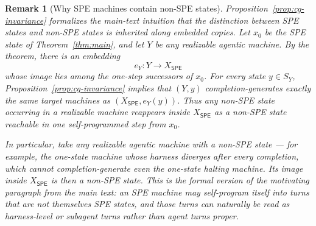 \documentclass[11pt]{article}
\newtheorem{remark}[definition]{Remark}
\newcommand{\SPE}{\mathsf{SPE}}
\begin{document}
\begin{remark}[Why SPE machines contain non-SPE states]\label{rem:nonspe}
Proposition~\ref{prop:cg-invariance} formalizes the main-text intuition that the distinction between SPE states and non-SPE states is inherited along embedded copies. Let $x_0$ be the SPE state of Theorem~\ref{thm:main}, and let $Y$ be any realizable agentic machine. By the theorem, there is an embedding
\[
e_Y:Y\to X_{\SPE}
\]
whose image lies among the one-step successors of $x_0$. For every state $y\in S_Y$, Proposition~\ref{prop:cg-invariance} implies that $(Y,y)$ completion-generates exactly the same target machines as $(X_{\SPE},e_Y(y))$. Thus any non-SPE state occurring in a realizable machine reappears inside $X_{\SPE}$ as a non-SPE state reachable in one self-programmed step from $x_0$.

In particular, take any realizable agentic machine with a non-SPE state --- for example, the one-state machine whose harness diverges after every completion, which cannot completion-generate even the one-state halting machine. Its image inside $X_{\SPE}$ is then a non-SPE state. This is the formal version of the motivating paragraph from the main text: an SPE machine may self-program itself into turns that are not themselves SPE states, and those turns can naturally be read as harness-level or subagent turns rather than agent turns proper.
\end{remark}
\end{document}

